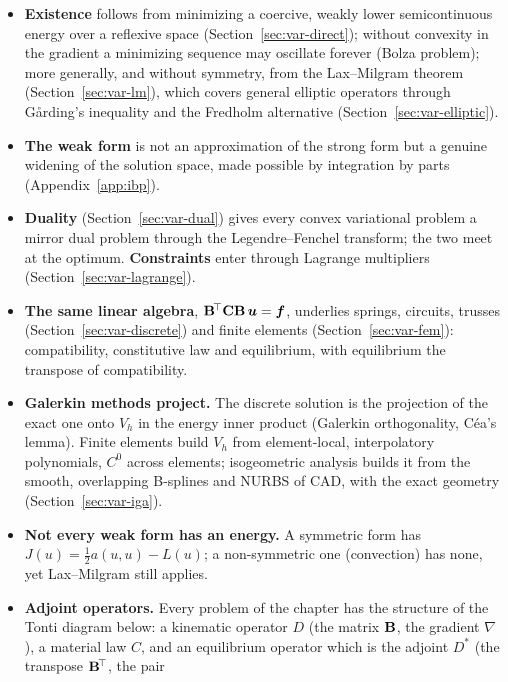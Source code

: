 \begin{gbox*}
\begin{itemize}
  \item \textbf{Existence} follows from minimizing a coercive, weakly lower
  semicontinuous energy over a reflexive space
  (Section~\ref{sec:var-direct}); without convexity in the gradient a
  minimizing sequence may oscillate forever (Bolza problem); more generally, and without symmetry, from
  the Lax--Milgram theorem (Section~\ref{sec:var-lm}), which covers general
  elliptic operators through G\aa rding's inequality and the Fredholm
  alternative (Section~\ref{sec:var-elliptic}).
  \item \textbf{The weak form} is not an approximation of the strong form
  but a genuine widening of the solution space, made possible by integration
  by parts (Appendix~\ref{app:ibp}).
  \item \textbf{Duality} (Section~\ref{sec:var-dual}) gives every convex
  variational problem a mirror dual problem through the Legendre--Fenchel
  transform; the two meet at the optimum. \textbf{Constraints} enter through
  Lagrange multipliers (Section~\ref{sec:var-lagrange}).
  \item \textbf{The same linear algebra}, $\mathbf{B}^{\!\top}\mathbf{C}\mathbf{B}\,\bm{u}=\bm{f}$,
  underlies springs, circuits, trusses (Section~\ref{sec:var-discrete}) and
  finite elements (Section~\ref{sec:var-fem}): compatibility, constitutive
  law and equilibrium, with equilibrium the transpose of compatibility.
  \item \textbf{Galerkin methods project.} The discrete solution is the
  projection of the exact one onto $V_h$ in the energy inner product
  (Galerkin orthogonality, C\'ea's lemma). Finite elements build $V_h$ from
  element-local, interpolatory polynomials, $C^0$ across elements;
  isogeometric analysis builds it from the smooth, overlapping B-splines and
  NURBS of CAD, with the exact geometry (Section~\ref{sec:var-iga}).
  \item \textbf{Not every weak form has an energy.} A symmetric form has
  $J(u)=\tfrac12a(u,u)-L(u)$; a non-symmetric one (convection) has none,
  yet Lax--Milgram still applies.
  \item \textbf{Adjoint operators.} Every problem of the chapter has the
  structure of the Tonti diagram below: a kinematic operator $D$ (the matrix
  $\mathbf{B}$, the gradient $\nabla$), a material law $C$, and an equilibrium
  operator which is the adjoint $D^\ast$ (the transpose $\mathbf{B}^{\!\top}$, the pair

\end{itemize}
\end{gbox*}
